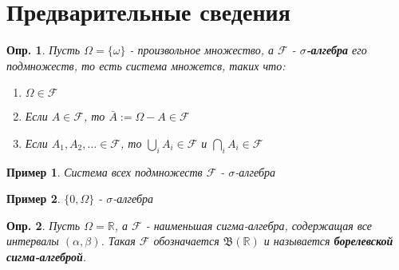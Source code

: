 \documentclass[12pt]{article}
\newtheorem{definition}{Опр.}
\newtheorem*{example}{Пример}
\theoremstyle{basic_theorem}
\theoremstyle{name_theorem}
\newcommand\defin[1]{\textbf{#1}}
\def\R{
    \mathbb{R}
}
\def\F{
    \mathcal{F}
}
\def\B{
    \mathfrak{B}
}
\begin{document}
    
\section{Предварительные сведения}

\begin{definition}
    Пусть $\Omega = \{\omega\}$ - произвольное множество, а $\F$ - \defin{$\sigma$-алгебра} его подмножеств,
    то есть система множетсв, таких что:
    \begin{enumerate}
        \item $\Omega \in \F$
        \item Если $A \in \F$, то $\bar{A} := \Omega - A \in \F $
        \item Если $A_1, A_2, \ldots \in \F$, то $\bigcup_iA_i \in \F$ и $ \bigcap_iA_i \in \F$ 
    \end{enumerate}
\end{definition}
\begin{example}
    Система всех подмножеств $\F$ - $\sigma$-алгебра
\end{example}
\begin{example}
    $\{0, \Omega\}$ - $\sigma$-алгебра
\end{example}
\begin{definition}
    Пусть $\Omega = \R$, а $\F$ - наименьшая сигма-алгебра, содержащая все
    интервалы $(\alpha, \beta)$. Такая $\F$ обозначается $\B(\R)$ и
    называется \defin{борелевской сигма-алгеброй}.
\end{definition}
\end{document}
